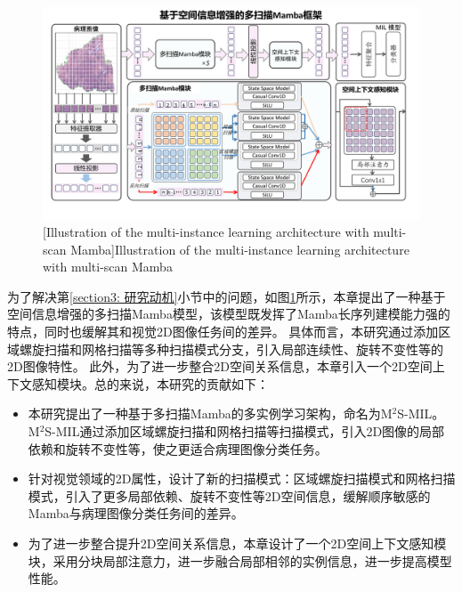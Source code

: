 \begin{figure}[h]
  \centering
  \includegraphics[width=\columnwidth]{figures/MMSMIL.pdf}
  [Illustration of the multi-instance learning architecture with multi-scan Mamba]{Illustration of the multi-instance learning architecture with multi-scan Mamba}
  \vspace{-10pt}
  \label{figure3: 多扫描Mamba}
  \end{figure}

为了解决第\ref{section3: 研究动机}小节中的问题，如图\ref{figure3: 多扫描Mamba}所示，本章提出了一种基于空间信息增强的多扫描Mamba模型，该模型既发挥了Mamba长序列建模能力强的特点，同时也缓解其和视觉2D图像任务间的差异。
具体而言，本研究通过添加区域螺旋扫描和网格扫描等多种扫描模式分支，引入局部连续性、旋转不变性等的2D图像特性。
此外，为了进一步整合2D空间关系信息，本章引入一个2D空间上下文感知模块。总的来说，本研究的贡献如下：
\begin{itemize}
 \item 本研究提出了一种基于多扫描Mamba的多实例学习架构，命名为M$^2$S-MIL。M$^2$S-MIL通过添加区域螺旋扫描和网格扫描等扫描模式，引入2D图像的局部依赖和旋转不变性等，使之更适合病理图像分类任务。
 \item	针对视觉领域的2D属性，设计了新的扫描模式：区域螺旋扫描模式和网格扫描模式，引入了更多局部依赖、旋转不变性等2D空间信息，缓解顺序敏感的Mamba与病理图像分类任务间的差异。
 \item	为了进一步整合提升2D空间关系信息，本章设计了一个2D空间上下文感知模块，采用分块局部注意力，进一步融合局部相邻的实例信息，进一步提高模型性能。
\end{itemize}

